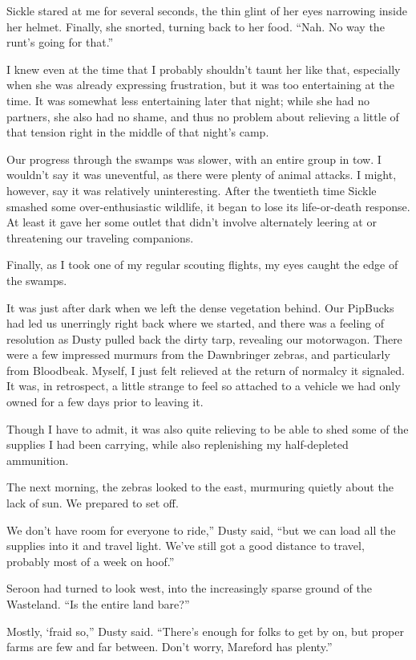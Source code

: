 Sickle stared at me for several seconds, the thin glint of her eyes narrowing inside her helmet. Finally, she snorted, turning back to her food. “Nah. No way the runt’s going for that.”

I knew even at the time that I probably shouldn’t taunt her like that, especially when she was already expressing frustration, but it was too entertaining at the time. It was somewhat less entertaining later that night; while she had no partners, she also had no shame, and thus no problem about relieving a little of that tension right in the middle of that night’s camp.

{\br}%
Our progress through the swamps was slower, with an entire group in tow. I wouldn’t say it was uneventful, as there were plenty of animal attacks. I might, however, say it was relatively uninteresting. After the twentieth time Sickle smashed some over-enthusiastic wildlife, it began to lose its life-or-death response. At least it gave her some outlet that didn’t involve alternately leering at or threatening our traveling companions.

Finally, as I took one of my regular scouting flights, my eyes caught the edge of the swamps.

It was just after dark when we left the dense vegetation behind. Our PipBucks had led us unerringly right back where we started, and there was a feeling of resolution as Dusty pulled back the dirty tarp, revealing our motorwagon. There were a few impressed murmurs from the Dawnbringer zebras, and particularly from Bloodbeak. Myself, I just felt relieved at the return of normalcy it signaled. It was, in retrospect, a little strange to feel so attached to a vehicle we had only owned for a few days prior to leaving it.

Though I have to admit, it was also quite relieving to be able to shed some of the supplies I had been carrying, while also replenishing my half-depleted ammunition.

The next morning, the zebras looked to the east, murmuring quietly about the lack of sun. We prepared to set off.

\leavevmode{}We don’t have room for everyone to ride,” Dusty said, “but we can load all the supplies into it and travel light. We’ve still got a good distance to travel, probably most of a week on hoof.”

Seroon had turned to look west, into the increasingly sparse ground of the Wasteland. “Is the entire land bare?”

\leavevmode{}Mostly, ‘fraid so,” Dusty said. “There’s enough for folks to get by on, but proper farms are few and far between. Don’t worry, Mareford has plenty.”

